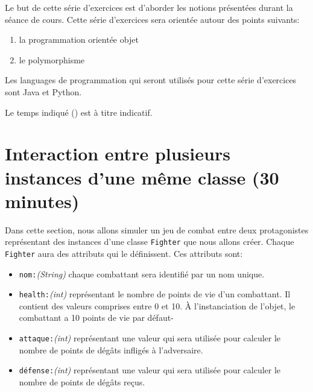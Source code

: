 




\ShowSolutiontrue
\ShowConseiltrue
\titre
{}

Le but de cette série d'exercices est d'aborder les notions présentées durant la séance de cours. Cette série d'exercices sera orientée autour des points suivants:
\begin{enumerate}
    \item la programmation orientée objet
    \item le polymorphisme
\end{enumerate}

Les languages de programmation qui seront utilisés pour cette série d'exercices sont Java et Python.

Le temps indiqué (\faClock) est à titre indicatif.

\section{Interaction entre plusieurs instances d'une même classe (30 minutes)}

Dans cette section, nous allons simuler un jeu de combat entre deux protagonistes représentant des instances d'une classe \lstinline{Fighter} que nous allons créer.
Chaque \lstinline{Fighter} aura des attributs qui le définissent. Ces attributs sont:

\begin{itemize}
    \item \lstinline{nom:}\textit{(String)} chaque combattant sera identifié par un nom unique.
    \item \lstinline{health:}\textit{(int)} représentant le nombre de points de vie d'un combattant. Il contient des valeurs comprises entre 0 et 10. À l'instanciation de l'objet, le combattant a 10 points de vie par défaut-
    \item \lstinline{attaque:}\textit{(int)} représentant une valeur qui sera utilisée pour calculer le nombre de points de dégâts infligés à l'adversaire.
    \item \lstinline{défense:}\textit{(int)} représentant une valeur qui sera utilisée pour calculer le nombre de points de dégâts reçus.\\
\end{itemize}

